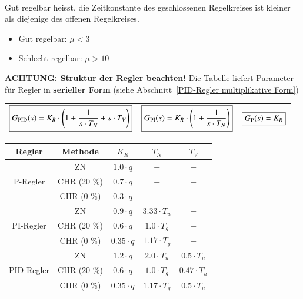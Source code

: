 \textbf{} \\
Gut regelbar heisst, die Zeitkonstante des geschlossenen Regelkreises ist kleiner als diejenige des offenen Regelkreises.

\begin{itemize}
    \item Gut regelbar: $\mu < 3$
    \item Schlecht regelbar: $\mu > 10$
\end{itemize}

\vspace{0.1cm}

\textbf{ACHTUNG: Struktur der Regler beachten!} Die Tabelle liefert Parameter für Regler in \textbf{serieller Form}
(siehe Abschnitt~\ref{PID-Regler multiplikative Form}) 

\begin{tabular}{c c c }
    $ \boxed{ G_{\rm PID}(s) = K_R \cdot \Bigg( 1 + \frac{1}{s \cdot T_N} + s \cdot T_V \Bigg) }$ & 
    $ \boxed{ G_{\rm PI}(s) = K_R \cdot \Bigg( 1 + \frac{1}{s \cdot T_N} \Bigg) }$ &
    $ \boxed{ G_{\rm P}(s) = K_R }$ 
\end{tabular}

\begin{center}
    \begin{tabular}{c c c c c}
        \toprule
        Regler      & Methode       & $K_R$             & $T_N$                 & $T_V$             \\
        \toprule
                    & ZN            & $1.0 \cdot q$     & $-$                   & $-$               \\
        P-Regler    & CHR (20 \%)   & $0.7 \cdot q$     & $-$                   & $-$               \\
                    & CHR (0 \%)    & $0.3 \cdot q$     & $-$                   & $-$               \\
        \midrule
                    & ZN            & $0.9 \cdot q$     & $3.33 \cdot T_u$      & $-$               \\
        PI-Regler   & CHR (20 \%)   & $0.6 \cdot q$     & $1.0 \cdot T_g$       & $-$               \\
                    & CHR (0 \%)    & $0.35 \cdot q$    & $1.17 \cdot T_g$      & $-$               \\
        \midrule
                    & ZN            & $1.2 \cdot q$     & $2.0 \cdot T_u$       & $0.5 \cdot T_u$   \\
        PID-Regler  & CHR (20 \%)   & $0.6 \cdot q$     & $1.0 \cdot T_g$       & $0.47 \cdot T_u$  \\
                    & CHR (0 \%)    & $0.35 \cdot q$    & $1.17 \cdot T_g$      & $0.5 \cdot T_u$   \\
        \bottomrule
    \end{tabular}
\end{center}

